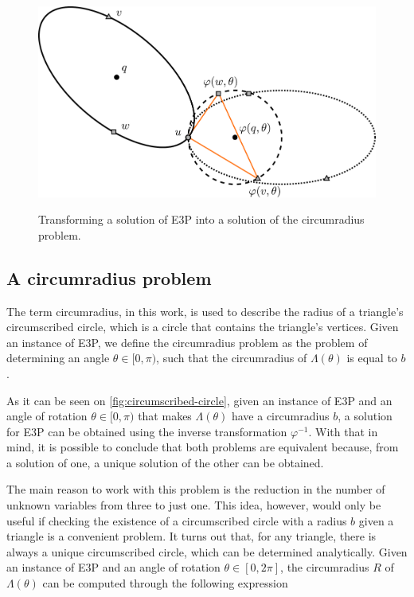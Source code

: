 \begin{figure}
	\centering
	\caption{Transforming a solution of E3P into a solution of the circumradius problem.}
	\includegraphics[scale=.4]{tex/figures/circumscribed-circle}
	\fautor
	\label{fig:circumscribed-circle}
\end{figure}

\subsection{A circumradius problem}

The term circumradius, in this work, is used to describe the radius of a triangle's circumscribed circle, which is a circle that contains the triangle's vertices. Given an instance of E3P, we define the circumradius problem as the problem of determining an angle $\theta\in[0, \pi)$, such that the circumradius of $\Lambda(\theta)$ is equal to $b$.

As it can be seen on \autoref{fig:circumscribed-circle}, given an instance of E3P and an angle of rotation $\theta\in[0, \pi)$ that makes $\Lambda(\theta)$ have a circumradius $b$, a solution for E3P can be obtained using the inverse transformation $\varphi^{-1}$. 
With that in mind, it is possible to conclude that both problems are equivalent because, from a solution of one, a unique solution of the other can be obtained.

The main reason to work with this problem is the reduction in the number of unknown variables from three to just one. This idea, however, would only be useful if checking the existence of a circumscribed circle with a radius $b$ given a triangle is a convenient problem.
It turns out that, for any triangle, there is always a unique circumscribed circle, which can be determined analytically. Given an instance of E3P and an angle of rotation $\theta \in [0, 2\pi]$, the circumradius $R$ of $\Lambda(\theta)$ can be computed through the following expression

